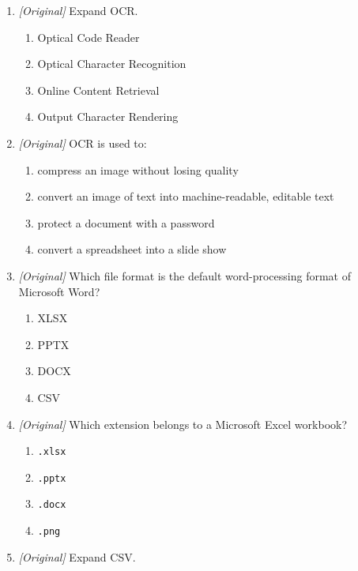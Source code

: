 \documentclass[11pt]{article}
\begin{document}
\begin{enumerate}[label=\textbf{Q\arabic*.}, leftmargin=*]
\begin{enumerate}[label=\Alph*.]
    \item stored as editable text, so it can be edited freely
    \item stored as a spreadsheet, so it can be sorted
    \item stored as a vector font, so it can be resized
  \end{enumerate}
\item \textit{[Original]} Expand OCR.
  \begin{enumerate}[label=\Alph*.]
    \item Optical Code Reader
    \item Optical Character Recognition
    \item Online Content Retrieval
    \item Output Character Rendering
  \end{enumerate}
\item \textit{[Original]} OCR is used to:
  \begin{enumerate}[label=\Alph*.]
    \item compress an image without losing quality
    \item convert an image of text into machine-readable, editable text
    \item protect a document with a password
    \item convert a spreadsheet into a slide show
  \end{enumerate}
\item \textit{[Original]} Which file format is the default word-processing
  format of Microsoft Word?
  \begin{enumerate}[label=\Alph*.]
    \item XLSX
    \item PPTX
    \item DOCX
    \item CSV
  \end{enumerate}
\item \textit{[Original]} Which extension belongs to a Microsoft Excel
  workbook?
  \begin{enumerate}[label=\Alph*.]
    \item \texttt{.xlsx}
    \item \texttt{.pptx}
    \item \texttt{.docx}
    \item \texttt{.png}
  \end{enumerate}
\item \textit{[Original]} Expand CSV.
  \begin{enumerate}[label=\Alph*.]

\end{enumerate}
\end{enumerate}
\end{document}
